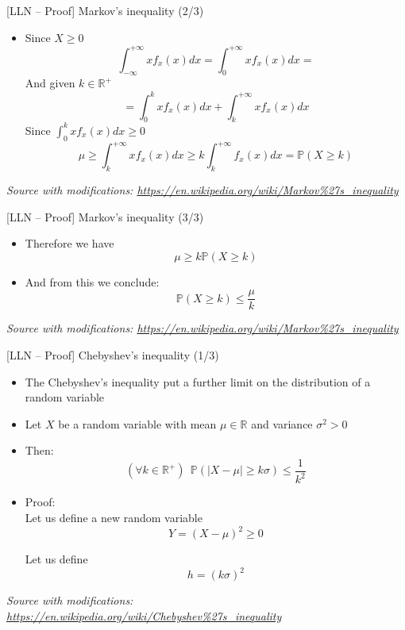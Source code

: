 \documentclass{beamer}
\begin{document}
\begin{frame}
{\centerline{[LLN -- Proof] Markov's inequality (2/3)}}

\begin{itemize}
\item Since $X \geq 0 $
$$\int_{- \infty }^{+ \infty} xf_x(x)dx = \int_{0}^{+ \infty} xf_x(x)dx = $$
And given $k \in \mathbb{R}^+$
$$= \int_{0}^{k} xf_x(x)dx + \int_{k}^{+ \infty} xf_x(x)dx$$
Since $\int_{0}^{k} xf_x(x)dx \geq 0$ 
$$ \mu \geq \int_{k}^{+ \infty} xf_x(x)dx \geq k\int_{k}^{+ \infty} f_x(x)dx =  \mathbb{P} ( X  \geq k) $$
\end{itemize}
 
\textit{\small
Source with modifications: \url{https://en.wikipedia.org/wiki/Markov\%27s_inequality}}

\end{frame}

\begin{frame}
{\centerline{[LLN -- Proof] Markov's inequality (3/3)}}

\begin{itemize}
\item Therefore we have
$$ \mu \geq  k \mathbb{P} ( X  \geq k) $$
\item And from this we conclude:
$$  \mathbb{P} ( X  \geq k) \leq \frac{\mu}{k}$$

\end{itemize}
 
\textit{\small
Source with modifications: \url{https://en.wikipedia.org/wiki/Markov\%27s_inequality}}

\end{frame}




\begin{frame}
{\centerline{[LLN -- Proof] Chebyshev's inequality (1/3)}}

\begin{itemize}
\item The Chebyshev's inequality put a further limit on the distribution of a random variable
\item Let $X$ be a random variable with mean $\mu \in \mathbb{R}$ and variance $\sigma^2 > 0$
\item Then:
$$ (\forall k \in \mathbb{R}^+) ~~  \mathbb{P} ( |X - \mu| \geq k\sigma) \leq \frac{1}{k^2} $$
\item Proof:\\
Let us define a new random variable
$$Y = (X - \mu)^2 \geq 0$$

Let us define
$$h = {(k\sigma)}^2$$


\end{itemize}


\textit{\small
Source with modifications: \url{https://en.wikipedia.org/wiki/Chebyshev\%27s_inequality}}
\end{frame}
\end{document}
